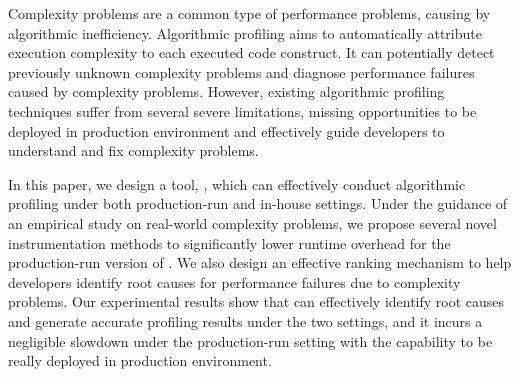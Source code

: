 Complexity problems are a common type of performance problems, 
causing by algorithmic inefficiency. 
Algorithmic profiling aims to automatically attribute execution 
complexity to each executed code construct.
It can potentially detect previously unknown complexity problems 
and diagnose performance failures caused by complexity problems. 
However, existing algorithmic profiling techniques 
suffer from several severe limitations, 
missing opportunities to be deployed in production environment
and effectively guide developers 
to understand and fix complexity problems. 

In this paper, we design a tool, \Tool, which can effectively conduct 
algorithmic profiling under both production-run and in-house settings.
Under the guidance of an empirical study on real-world complexity problems, 
we propose several novel instrumentation methods to 
significantly lower runtime overhead
for the production-run version of \Tool.
We also design an effective ranking mechanism to help developers identify 
root causes for performance failures due to complexity problems. 
Our experimental results show that \Tool 
can effectively identify root causes and generate 
accurate profiling results under the two settings, 
and it incurs a negligible slowdown under the production-run setting
with the capability to be really deployed in production environment. 







